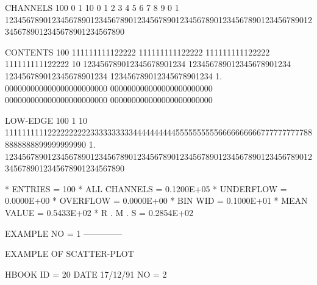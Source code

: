 \begin{Listing}
 CHANNELS 100   0                                                                                                  1   
           10   0        1         2         3         4         5         6         7         8         9         0   
            1   1234567890123456789012345678901234567890123456789012345678901234567890123456789012345678901234567890   
 
 CONTENTS 100            111111111122222          111111111122222          111111111122222          111111111122222 
           10   123456789012345678901234 123456789012345678901234 123456789012345678901234 123456789012345678901234 
            1.  000000000000000000000000 000000000000000000000000 000000000000000000000000 000000000000000000000000 
 
 LOW-EDGE 100                                                                                                      1
           10            1111111111222222222233333333334444444444555555555566666666667777777777888888888899999999990
            1.  1234567890123456789012345678901234567890123456789012345678901234567890123456789012345678901234567890
 
 * ENTRIES =        100      * ALL CHANNELS = 0.1200E+05      * UNDERFLOW = 0.0000E+00      * OVERFLOW = 0.0000E+00
 * BIN WID = 0.1000E+01      * MEAN VALUE   = 0.5433E+02      * R . M . S = 0.2854E+02

\newpage

 EXAMPLE NO = 1                                                                  
 --------------                                                                  
 
 EXAMPLE OF SCATTER-PLOT                                                         
 
 HBOOK     ID =        20                                        DATE  17/12/91              NO =   2
 

\end{Listing}
